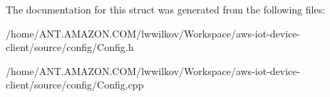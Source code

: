 The documentation for this struct was generated from the following files\+:\begin{DoxyCompactItemize}
\item 
/home/\+A\+N\+T.\+A\+M\+A\+Z\+O\+N.\+C\+O\+M/lwwilkov/\+Workspace/aws-\/iot-\/device-\/client/source/config/Config.\+h\item 
/home/\+A\+N\+T.\+A\+M\+A\+Z\+O\+N.\+C\+O\+M/lwwilkov/\+Workspace/aws-\/iot-\/device-\/client/source/config/Config.\+cpp\end{DoxyCompactItemize}
